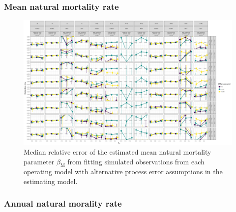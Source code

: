 \documentclass[
  12pt,
]{article}
\begin{document}
\hypertarget{mean-natural-mortality-rate}{%
\subsubsection*{Mean natural mortality
rate}\label{mean-natural-mortality-rate}}

\begin{landscape}
\begin{figure}
\caption{Median relative error of the estimated mean natural mortality parameter $\beta_\text{M}$ from fitting simulated observations from each operating model with alternative process error assumptions in the estimating model.}\label{mean_M_bias}
\begin{center}
\includegraphics[height = \textheight]{mean_M_bias_all_PE_effect.png}
\end{center}
\end{figure}
\end{landscape}

\hypertarget{annual-natural-morality-rate}{%
\subsubsection*{Annual natural morality
rate}\label{annual-natural-morality-rate}}
\end{document}
